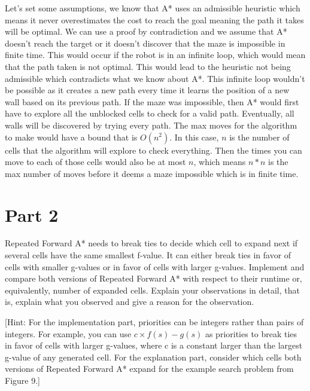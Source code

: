 \documentclass{article}
\begin{document}
\begin{enumerate}
{     Let's set some assumptions, we know that A* uses an admissible heuristic which means it never overestimates the cost to reach the goal meaning the path it takes will be optimal. We can use a proof by contradiction and we assume that A* doesn't reach the target or it doesn't discover that the maze is impossible in finite time. This would occur if the robot is in an infinite loop, which would mean that the path taken is not optimal. This would lead to the heuristic not being admissible which contradicts what we know about A*. This infinite loop wouldn't be possible as it creates a new path every time it learns the position of a new wall based on its previous path. If the maze was impossible, then A* would first have to explore all the unblocked cells to check for a valid path. Eventually, all walls will be discovered by trying every path. The max moves for the algorithm to make would have a bound that is $O(n^2)$. In this case, $n$ is the number of cells that the algorithm will explore to check everything. Then the times you can move to each of those cells would also be at most $n$, which means $n*n$ is the max number of moves before it deems a maze impossible which is in finite time.
    }
\end{enumerate}

\newpage
\section*{Part 2}
Repeated Forward A* needs to break ties to decide which cell to expand next if several cells have the same smallest f-value. It can either break ties in favor of cells with smaller g-values or in favor of cells with larger g-values. Implement and compare both versions of Repeated Forward A* with respect to their runtime or, equivalently, number of expanded cells. Explain your observations in detail, that is, explain what you observed and give a reason for the observation.

[Hint: For the implementation part, priorities can be integers rather than pairs of integers. For example, you can use $c \times f (s) - g(s)$ as priorities to break ties in favor of cells with larger g-values, where c is a constant larger than the largest g-value of any generated cell. For the explanation part, consider which cells both versions of Repeated Forward A* expand for the example search problem from Figure 9.]
\end{document}
